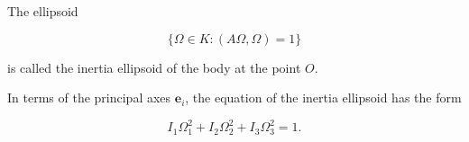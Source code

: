 The ellipsoid

$$\{\Omega \in K : (A\Omega, \Omega) = 1\}$$

is called the inertia ellipsoid of the body at the point $O$.

In terms of the principal axes $\mathbf{e}_i$, the equation of the inertia ellipsoid has the form

$$I_1 \Omega_1^2 + I_2 \Omega_2^2 + I_3 \Omega_3^2 = 1.$$
